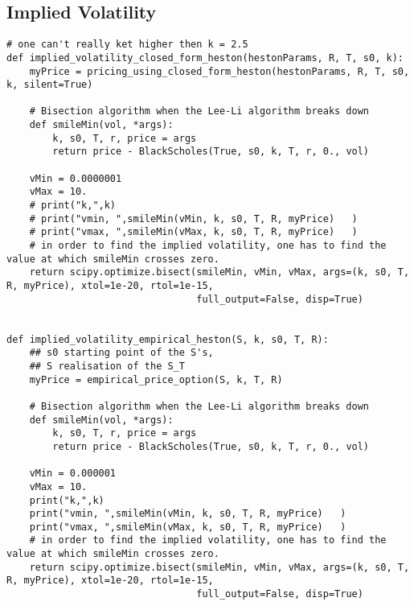\subsection{Implied Volatility}
\begin{Verbatim}[fontsize=\tiny]
# one can't really ket higher then k = 2.5
def implied_volatility_closed_form_heston(hestonParams, R, T, s0, k):
    myPrice = pricing_using_closed_form_heston(hestonParams, R, T, s0, k, silent=True)

    # Bisection algorithm when the Lee-Li algorithm breaks down
    def smileMin(vol, *args):
        k, s0, T, r, price = args
        return price - BlackScholes(True, s0, k, T, r, 0., vol)

    vMin = 0.0000001
    vMax = 10.
    # print("k,",k)
    # print("vmin, ",smileMin(vMin, k, s0, T, R, myPrice)   )
    # print("vmax, ",smileMin(vMax, k, s0, T, R, myPrice)   )
    # in order to find the implied volatility, one has to find the value at which smileMin crosses zero.
    return scipy.optimize.bisect(smileMin, vMin, vMax, args=(k, s0, T, R, myPrice), xtol=1e-20, rtol=1e-15,
                                 full_output=False, disp=True)


def implied_volatility_empirical_heston(S, k, s0, T, R):
    ## s0 starting point of the S's,
    ## S realisation of the S_T
    myPrice = empirical_price_option(S, k, T, R)

    # Bisection algorithm when the Lee-Li algorithm breaks down
    def smileMin(vol, *args):
        k, s0, T, r, price = args
        return price - BlackScholes(True, s0, k, T, r, 0., vol)

    vMin = 0.000001
    vMax = 10.
    print("k,",k)
    print("vmin, ",smileMin(vMin, k, s0, T, R, myPrice)   )
    print("vmax, ",smileMin(vMax, k, s0, T, R, myPrice)   )
    # in order to find the implied volatility, one has to find the value at which smileMin crosses zero.
    return scipy.optimize.bisect(smileMin, vMin, vMax, args=(k, s0, T, R, myPrice), xtol=1e-20, rtol=1e-15,
                                 full_output=False, disp=True)
\end{Verbatim}

